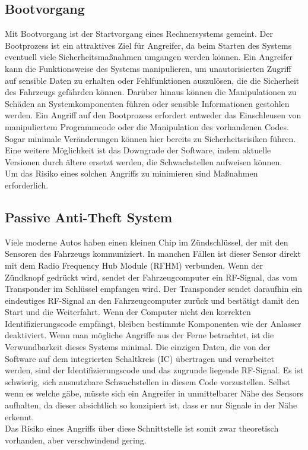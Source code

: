 \subsection{Bootvorgang}
Mit Bootvorgang ist der Startvorgang eines Rechnersystems gemeint. Der Bootprozess ist ein attraktives Ziel für Angreifer, da beim Starten des Systems eventuell viele Sicherheitsmaßnahmen umgangen werden können. Ein Angreifer kann die Funktionsweise des Systems manipulieren, um unautorisierten Zugriff auf sensible Daten zu erhalten oder Fehlfunktionen auszulösen, die die Sicherheit des Fahrzeugs gefährden können. Darüber hinaus können die Manipulationen zu Schäden an Systemkomponenten führen oder sensible Informationen gestohlen werden. Ein Angriff auf den Bootprozess erfordert entweder das Einschleusen von manipuliertem Programmcode oder die Manipulation des vorhandenen Codes. Sogar minimale Veränderungen können hier bereits zu Sicherheitsrisiken führen. Eine weitere Möglichkeit ist das Downgrade der Software, indem aktuelle Versionen durch ältere ersetzt werden, die Schwachstellen aufweisen können. \cite[83]{Wurm.2022} \\
Um das Risiko eines solchen Angriffs zu minimieren sind Maßnahmen erforderlich.

\subsection{Passive Anti-Theft System}
Viele moderne Autos haben einen kleinen Chip im Zündschlüssel, der mit den Sensoren des Fahrzeugs kommuniziert. In manchen Fällen ist dieser Sensor direkt mit dem Radio Frequency Hub Module (RFHM) verbunden. Wenn der Zündknopf gedrückt wird, sendet der Fahrzeugcomputer ein RF-Signal, das vom Transponder im Schlüssel empfangen wird. Der Transponder sendet daraufhin ein eindeutiges RF-Signal an den Fahrzeugcomputer zurück und bestätigt damit den Start und die Weiterfahrt. Wenn der Computer nicht den korrekten Identifizierungscode empfängt, bleiben bestimmte Komponenten wie der Anlasser deaktiviert.
Wenn man mögliche Angriffe aus der Ferne betrachtet, ist die Verwundbarkeit dieses Systems minimal. Die einzigen Daten, die von der Software auf dem integrierten Schaltkreis (IC) übertragen und verarbeitet werden, sind der Identifizierungscode und das zugrunde liegende RF-Signal. Es ist schwierig, sich ausnutzbare Schwachstellen in diesem Code vorzustellen. Selbst wenn es welche gäbe, müsste sich ein Angreifer in unmittelbarer Nähe des Sensors aufhalten, da dieser absichtlich so konzipiert ist, dass er nur Signale in der Nähe erkennt.\cite[13]{Miller.2015} \\
Das Risiko eines Angriffs über diese Schnittstelle ist somit zwar theoretisch vorhanden, aber verschwindend gering.

